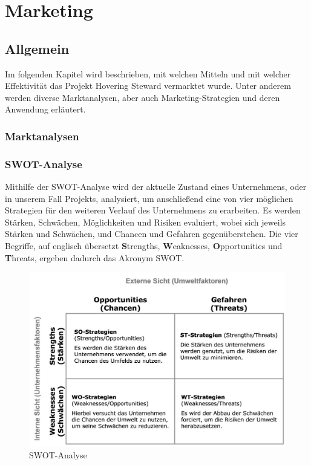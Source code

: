 \chapter{Marketing}
\renewcommand{\kapitelautor}{Autor: Markus Kaiser}

\section{Allgemein}
Im folgenden Kapitel wird beschrieben, mit welchen Mitteln und mit welcher Effektivität
das Projekt Hovering Steward vermarktet wurde. Unter anderem werden diverse Marktanalysen,
aber auch Marketing-Strategien und deren Anwendung erläutert.

  \subsection{Marktanalysen}
    \subsection*{SWOT-Analyse}
    Mithilfe der SWOT-Analyse wird der aktuelle Zustand eines Unternehmens, oder in unserem Fall Projekts, analysiert, um anschließend eine von vier möglichen Strategien
    für den weiteren Verlauf des Unternehmens zu erarbeiten. Es werden Stärken, Schwächen, Möglichkeiten und Risiken evaluiert, wobei sich jeweils Stärken und Schwächen, und
    Chancen und Gefahren gegenüberstehen. Die vier Begriffe, auf englisch übersetzt \textbf{S}trengths, \textbf{W}eaknesses, \textbf{O}pportunities und \textbf{T}hreats,
    ergeben dadurch das Akronym SWOT.

    \begin{figure}[H]
      \begin{centering}
      \includegraphics[width = 1\textwidth]{Bilder/swot.jpg}
      \par\end{centering}
      \caption[SWOT-Analyse]{SWOT-Analyse\cite{pic_swot}}
      \label{swot}
    \end{figure}

